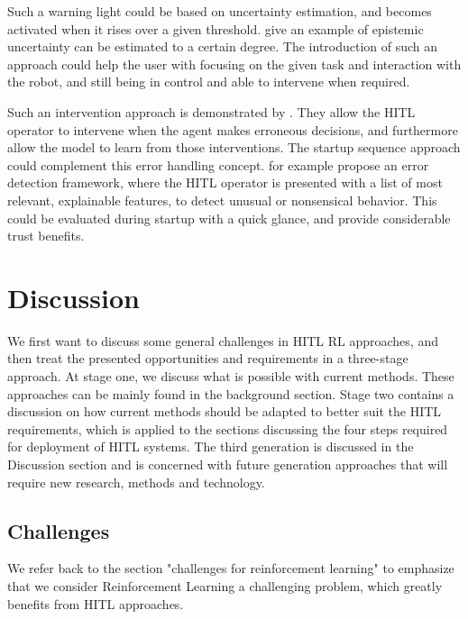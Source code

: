 \documentclass[twoside,11pt]{article}
\begin{document}
Such a warning light could be based on uncertainty estimation, and becomes activated when it rises over a given threshold. \citet{JainEtAl:2021:EpistemicUncertaintyPrediction} give an example of epistemic uncertainty can be estimated to a certain degree. The introduction of such an approach could help the user with focusing on the given task and interaction with the robot, and still being in control and able to intervene when required.

Such an intervention approach is demonstrated by \citep{WuEtAl:2021:HITLDRLAutonomousDriving}. They allow the HITL operator to intervene when the agent makes erroneous decisions, and furthermore allow the model to learn from those interventions. 
The startup sequence approach could complement this error handling concept. \citet{LiuGuoMahmud:2021:HITLErrorDetectionFramework} for example propose an error detection framework, where the HITL operator is presented with a list of most relevant, explainable features, to detect unusual or nonsensical behavior. This could be evaluated during startup with a quick glance, and provide considerable trust benefits.


\section{Discussion}

We first want to discuss some general challenges in HITL RL approaches, and then treat the presented opportunities and requirements in a three-stage approach. At stage one, we discuss what is possible with current methods. These approaches can be mainly found in the background section. Stage two contains a discussion on how current methods should be adapted to better suit the HITL requirements, which is applied to the sections discussing the four steps required for deployment of HITL systems. The third generation is discussed in the Discussion section and is concerned with future generation approaches that will require new research, methods and technology.

\subsection{Challenges}

We refer back to the section "challenges for reinforcement learning" to emphasize that we consider Reinforcement Learning a challenging problem, which greatly benefits from HITL approaches.
\end{document}
